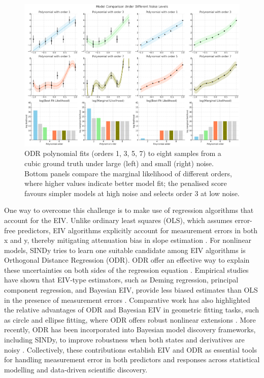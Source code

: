 \begin{figure}
\includegraphics[width=0.9\linewidth]{MSc_Statistics_Research_Report_Template/images/output.png} 
\caption{ODR polynomial fits (orders 1, 3, 5, 7) to eight samples from a cubic ground truth under large (left) and small (right) noise. Bottom panels compare the marginal likelihood of different orders, where higher values indicate better model fit; the penalised score favours simpler models at high noise and selects order 3 at low noise.}
\end{figure}

One way to overcome this challenge is to make use of regression algorithms that account for the EIV.
Unlike ordinary least squares (OLS), which assumes error-free predictors, EIV algorithms explicitly account for measurement errors in both x and y, thereby mitigating attenuation bias in slope estimation \citep{fuller2009, carroll2006}. For nonlinear models, SINDy tries to learn one suitable candidate among EIV algorithms is Orthogonal Distance Regression (ODR).
ODR offer an effective way to explain these uncertainties on both sides of the regression equation \citep{boggs1989}. 
Empirical studies have shown that EIV-type estimators, such as Deming regression, principal component regression, and Bayesian EIV, provide less biased estimates than OLS in the presence of measurement errors \citep{mikkonen2019}. Comparative work has also highlighted the relative advantages of ODR and Bayesian EIV in geometric fitting tasks, such as circle and ellipse fitting, where ODR offers robust nonlinear extensions \citep{splett2018}. More recently, ODR has been incorporated into Bayesian model discovery frameworks, including SINDy, to improve robustness when both states and derivatives are noisy \citep{quade2018, champion2020}. Collectively, these contributions establish EIV and ODR as essential tools for handling measurement error in both predictors and responses across statistical modelling and data-driven scientific discovery.



